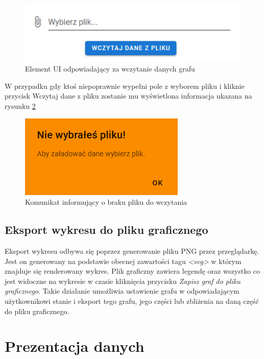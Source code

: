 \documentclass[12pt,a4paper]{article} %
\begin{document}
\begin{figure}[!h]
    \center
        \includegraphics[scale=1]{rys/wojtek/1.png}
        \caption{Element UI odpowiadający za wczytanie danych grafu}
        \label{UIloadFile}
\end{figure}
W przypadku gdy ktoś niepoprawnie wypełni pole z wyborem pliku i kliknie przycisk {Wczytaj dane z pliku} zostanie mu wyświetlona informacja ukazana na rysunku \ref{uidialog}

\begin{figure}[!h]
    \center
        \includegraphics[scale=1]{rys/wojtek/2.png}
        \caption{Komunikat informujący o braku pliku do wczytania}
        \label{uidialog}
\end{figure}
\subsection{Eksport wykresu do pliku graficznego}

Eksport wykresu odbywa się poprzez generowanie pliku PNG przez przeglądarkę. Jest on generowany na podstawie obecnej zawartości tagu \textit{<svg>} w którym znajduje się renderowany wykres. Plik graficzny zawiera legendę oraz wszystko co jest widoczne na wykresie w czasie kliknięcia przycisku \textit{Zapisz graf do pliku graficznego}. Takie działanie umożliwia ustawienie grafu w odpowiadającym użytkownikowi stanie i eksport tego grafu, jego części lub zbliżenia na daną część do pliku graficznego.

\section{Prezentacja danych}
    
\end{document}
